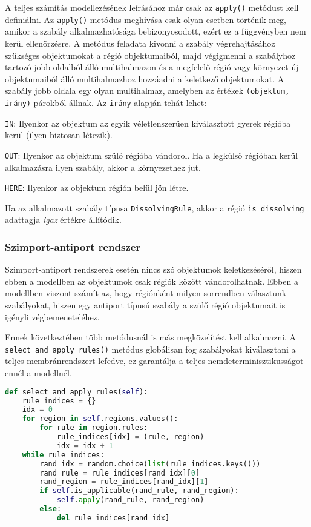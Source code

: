 A teljes számítás modellezésének leírásához már csak az \verb|apply()| metódust kell definiálni. Az \verb|apply()| metódus meghívása csak olyan esetben történik meg, amikor a szabály alkalmazhatósága bebizonyosodott, ezért ez a függvényben nem kerül ellenőrzésre. A metódus feladata kivonni a szabály végrehajtásához szükséges objektumokat a régió objektumaiból, majd végigmenni a szabályhoz tartozó jobb oldalból álló multihalmazon és a megfelelő régió vagy környezet új objektumaiból álló multihalmazhoz hozzáadni a keletkező objektumokat. A szabály jobb oldala egy olyan multihalmaz, amelyben az értékek \verb|(objektum, irány)| párokból állnak. 
Az \verb|irány| alapján tehát lehet:
\begin{compactenum}
\item \verb|IN|: Ilyenkor az objektum az egyik véletlenszerűen kiválasztott gyerek régióba kerül (ilyen biztosan létezik).
\item \verb|OUT|: Ilyenkor az objektum szülő régióba vándorol. Ha a legkülső régióban kerül alkalmazásra ilyen szabály, akkor a környezethez jut. 
\item \verb|HERE|: Ilyenkor az objektum régión belül jön létre.
\end{compactenum}

Ha az alkalmazott szabály típusa \verb|DissolvingRule|, akkor a régió \verb|is_dissolving| adattagja \textit{igaz} értékre állítódik.

\subsubsection{Szimport-antiport rendszer}

Szimport-antiport rendszerek esetén nincs szó objektumok keletkezéséről, hiszen ebben a modellben az objektumok csak régiók között vándorolhatnak. Ebben a modellben viszont számít az, hogy régiónként milyen sorrendben választunk szabályokat, hiszen egy antiport típusú szabály a szülő régió objektumait is igényli végbemeneteléhez. 


Ennek következtében több metódusnál is más megközelítést kell alkalmazni. A \verb|select_and_apply_rules()| metódus globálisan fog szabályokat kiválasztani a teljes membránrendszert lefedve, ez garantálja a teljes nemdeterminisztikusságot ennél a modellnél.

\begin{lstlisting}[language={Python}]
def select_and_apply_rules(self):
	rule_indices = {}
	idx = 0
	for region in self.regions.values():
		for rule in region.rules:
			rule_indices[idx] = (rule, region)
			idx = idx + 1
	while rule_indices:
		rand_idx = random.choice(list(rule_indices.keys()))
		rand_rule = rule_indices[rand_idx][0]
		rand_region = rule_indices[rand_idx][1]
		if self.is_applicable(rand_rule, rand_region):
			self.apply(rand_rule, rand_region)
		else:
			del rule_indices[rand_idx]
\end{lstlisting}

